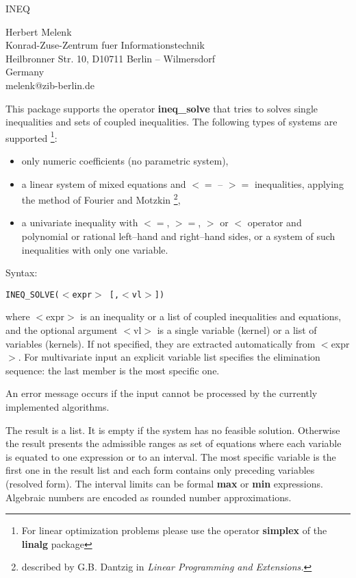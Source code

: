 
\begin{center} {\Large INEQ} \end{center}

\begin{center} Herbert Melenk \\ Konrad-Zuse-Zentrum fuer
Informationstechnik \\
Heilbronner Str. 10, D10711 Berlin -- Wilmersdorf\\ Germany \\
melenk@zib-berlin.de \end{center}

This package supports the operator {\bf ineq\_solve} that
tries to solves single inequalities and sets of coupled inequalities.
The following types of systems are supported
\footnote{For linear optimization problems please use the operator
{\bf simplex} of the {\bf linalg} package}:
\begin{itemize}
\item only numeric coefficients (no parametric system),
\item a linear system of mixed equations and $<=$ -- $>=$
     inequalities, applying the method of Fourier and Motzkin
     \footnote{described by G.B. Dantzig in {\em Linear Programming
      and Extensions.}},
\item a univariate inequality with $<=$, $>=$, $>$ or $<$ operator
     and polynomial or rational left--hand and right--hand sides,
     or a system of such inequalities with only one variable.
\end{itemize}

Syntax:
\begin{center}
{\tt INEQ\_SOLVE($<$expr$>$ [,$<$vl$>$])}
\end{center}
where $<$expr$>$ is an inequality or a list of coupled inequalities
and equations, and the optional argument $<$vl$>$ is a single
variable (kernel) or a list of variables (kernels). If not
specified, they are extracted automatically from $<$expr$>$.
For multivariate input an explicit variable list specifies the
elimination sequence: the last member is the most specific one.

An error message occurs if the input cannot be processed by the
currently implemented algorithms.

The result is a list. It is empty if the system has no feasible solution.
Otherwise the result presents the admissible ranges as set
of equations where each variable is equated to
one expression or to an interval.
The most specific variable is the first one in the result list and
each form contains only preceding variables (resolved form).
The interval limits can be formal {\bf max} or {\bf min} expressions.
Algebraic numbers are encoded as rounded number approximations.

